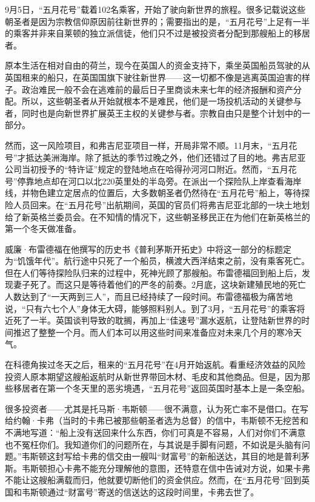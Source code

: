 \documentclass[12pt,oneside]{book}
\begin{document}
\begin{mdframed}
9月5日，“五月花号”载着102名乘客，开始了驶向新世界的旅程。很多记载说这些朝圣者是因为宗教信仰原因前往新世界的；需要指出的是，“五月花号”上足有一半的乘客并非来自莱顿的独立派信徒，他们只不过是被投资者分配到那艘船上的移居者。

原本生活在相对自由的荷兰，现今在英国人的资金支持下，乘坐英国船员驾驶的从英国租来的船只，在英国国旗下驶往新世界——这一切都不像是逃离英国迫害的样子。政治难民一般不会在逃难前的最后日子里商谈未来七年的经济报酬和资产分配。所以，这些朝圣者从开始就根本不是难民，他们是一场投机活动的关键参与者，同时也是向新世界扩展英王主权的关键参与者。宗教自由只是整个计划中的一部分。

然而，这一风险项目，和弗吉尼亚项目一样，开局非常不顺。11月末，“五月花号”才抵达美洲海岸。除了抵达的季节过晚之外，他们还错过了目的地。弗吉尼亚公司当初授予的“特许证”规定的登陆地点在哈得孙河河口附近。然而，“五月花号”停靠地点却在河口以北220英里处的半岛旁。在派出一个探险队上岸查看海岸线，并物色建立定居点的位置后，大多数朝圣者仍然待在“五月花号”船上，等待探险人员回来。在“五月花号”出航期间，英国的官员们将弗吉尼亚北部的一块土地划给了新英格兰委员会。在不知情的情况下，这些朝圣移民正在为他们在新英格兰的第一个冬天做准备。

威廉·布雷德福在他撰写的历史书《普利茅斯开拓史》中将这一部分的标题定为“饥饿年代”。航行途中只死了一个船员，横渡大西洋结束之前，没有乘客死亡。但在人们等待探险队归来的过程中，死神光顾了那艘船。布雷德福回到船上后，发现妻子死了。而这只是等待着他们的严冬的前奏。2月底，这块新建殖民地的死亡人数达到了“一天两到三人”，而且已经持续了一段时间。布雷德福极为痛苦地说，“只有六七个人”身体无大碍，能够照料别人。到了3月，“五月花号”的乘客将近死了一半。英国谈判导致的耽搁，再加上“佳速号”漏水返航，让登陆新世界的时间推迟了整整一个月。而人们本可以用这些时间来准备应对未来几个月的寒冷天气。

在科德角挨过冬天之后，租来的“五月花号”在4月开始返航。看重经济效益的风险投资人原本期望这艘船返航时从新世界带回木材、毛皮和其他商品。但是，因为那些移居者在第一个冬天里的恶劣境遇，“五月花号”返回英国时基本上是一条空船。

很多投资者——尤其是托马斯·韦斯顿——很不满意，认为死亡率不是借口。在写给约翰·卡弗（当时的卡弗已被那些朝圣者选为总督）的信中，韦斯顿不无挖苦和不满地写道：“船上没有送回来什么东西，你们可真是不容易，人们对你们不满意也不冤枉你们。我知道你们的问题所在，与其说是手脚有问题，不如说是头脑有问题。”韦斯顿这封写给卡弗的信交由一艘叫“财富号”的新船送达，其目的地是普利茅斯。韦斯顿担心卡弗不能充分理解他的意图，还特意在信中告诫对方说，如果卡弗不能让这艘船满载而归，他就要切断他们的资金供应。然而，在“五月花号”回到英国和韦斯顿通过“财富号”寄送的信送达的这段时间里，卡弗去世了。


\end{mdframed}
\end{document}
